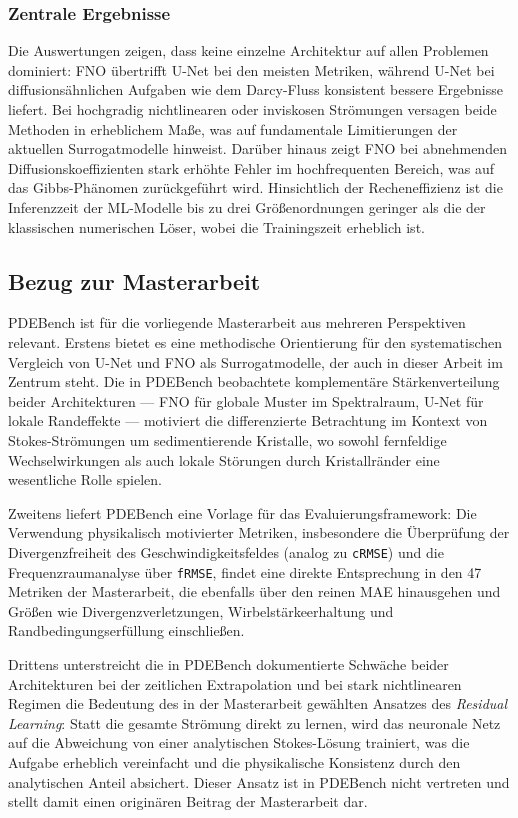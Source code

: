 \documentclass[a4paper,12pt]{article}
\begin{document}
\subsubsection*{Zentrale Ergebnisse}

Die Auswertungen zeigen, dass keine einzelne Architektur auf allen Problemen dominiert:
FNO übertrifft U-Net bei den meisten Metriken, während U-Net bei diffusionsähnlichen
Aufgaben wie dem Darcy-Fluss konsistent bessere Ergebnisse liefert. Bei hochgradig
nichtlinearen oder inviskosen Strömungen versagen beide Methoden in erheblichem Maße,
was auf fundamentale Limitierungen der aktuellen Surrogatmodelle hinweist. Darüber hinaus
zeigt FNO bei abnehmenden Diffusionskoeffizienten stark erhöhte Fehler im hochfrequenten
Bereich, was auf das Gibbs-Phänomen zurückgeführt wird. Hinsichtlich der Recheneffizienz
ist die Inferenzzeit der ML-Modelle bis zu drei Größenordnungen geringer als die der
klassischen numerischen Löser, wobei die Trainingszeit erheblich ist.

\subsection*{Bezug zur Masterarbeit}

PDEBench ist für die vorliegende Masterarbeit aus mehreren Perspektiven relevant.
Erstens bietet es eine methodische Orientierung für den systematischen Vergleich von
U-Net und FNO als Surrogatmodelle, der auch in dieser Arbeit im Zentrum steht.
Die in PDEBench beobachtete komplementäre Stärkenverteilung beider Architekturen ---
FNO für globale Muster im Spektralraum, U-Net für lokale Randeffekte --- motiviert
die differenzierte Betrachtung im Kontext von Stokes-Strömungen um sedimentierende
Kristalle, wo sowohl fernfeldige Wechselwirkungen als auch lokale Störungen durch
Kristallränder eine wesentliche Rolle spielen.

Zweitens liefert PDEBench eine Vorlage für das Evaluierungsframework: Die Verwendung
physikalisch motivierter Metriken, insbesondere die Überprüfung der Divergenzfreiheit
des Geschwindigkeitsfeldes (analog zu \texttt{cRMSE}) und die Frequenzraumanalyse über
\texttt{fRMSE}, findet eine direkte Entsprechung in den 47 Metriken der Masterarbeit,
die ebenfalls über den reinen MAE hinausgehen und Größen wie Divergenzverletzungen,
Wirbelstärkeerhaltung und Randbedingungserfüllung einschließen.

Drittens unterstreicht die in PDEBench dokumentierte Schwäche beider Architekturen bei
der zeitlichen Extrapolation und bei stark nichtlinearen Regimen die Bedeutung des in
der Masterarbeit gewählten Ansatzes des \emph{Residual Learning}: Statt die gesamte
Strömung direkt zu lernen, wird das neuronale Netz auf die Abweichung von einer
analytischen Stokes-Lösung trainiert, was die Aufgabe erheblich vereinfacht und die
physikalische Konsistenz durch den analytischen Anteil absichert. Dieser Ansatz ist
in PDEBench nicht vertreten und stellt damit einen originären Beitrag der Masterarbeit
dar.
\end{document}
